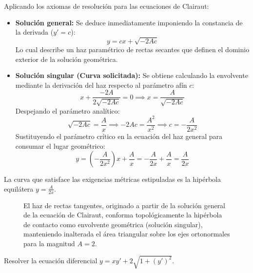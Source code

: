 \begin{tcolorbox}
Aplicando los axiomas de resolución para las ecuaciones de Clairaut:
\begin{itemize}
    \item \textbf{Solución general:} Se deduce inmediatamente imponiendo la constancia de la derivada ($y' = c$):
    $$ y = cx + \sqrt{-2Ac} $$
    Lo cual describe un haz paramétrico de rectas secantes que definen el dominio exterior de la solución geométrica.
    \item \textbf{Solución singular (Curva solicitada):} Se obtiene calculando la envolvente mediante la derivación del haz respecto al parámetro afín $c$:
    $$ x + \frac{-2A}{2\sqrt{-2Ac}} = 0 \implies x = \frac{A}{\sqrt{-2Ac}} $$
    Despejando el parámetro analítico:
    $$ \sqrt{-2Ac} = \frac{A}{x} \implies -2Ac = \frac{A^2}{x^2} \implies c = -\frac{A}{2x^2} $$
    Sustituyendo el parámetro crítico en la ecuación del haz general para consumar el lugar geométrico:
    $$ y = \left(-\frac{A}{2x^2}\right)x + \frac{A}{x} = -\frac{A}{2x} + \frac{A}{x} = \frac{A}{2x} $$
\end{itemize}
La curva que satisface las exigencias métricas estipuladas es la hipérbola equilátera $y = \frac{A}{2x}$.

\begin{figure}[H]
    \centering
    
    \caption{El haz de rectas tangentes, originado a partir de la solución general de la ecuación de Clairaut, conforma topológicamente la hipérbola de contacto como envolvente geométrica (solución singular), manteniendo inalterada el área triangular sobre los ejes ortonormales para la magnitud $A=2$.}
\end{figure}
\end{tcolorbox}

\begin{ejercicio}
Resolver la ecuación diferencial $y = x y' + 2\sqrt{1 + (y')^2}$.
\end{ejercicio}

